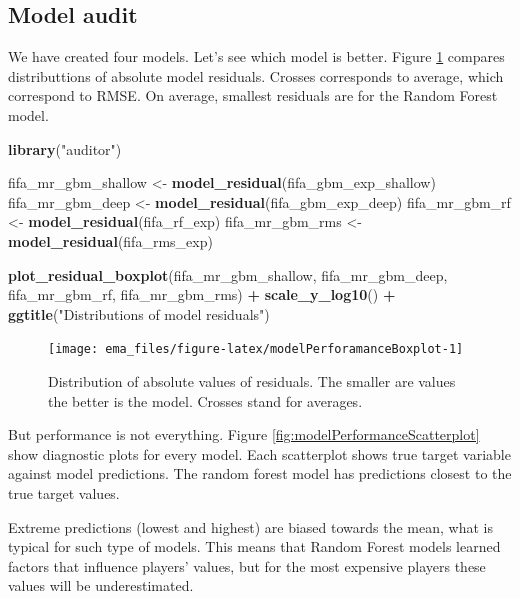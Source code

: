 \documentclass[12pt,]{krantz}
\newenvironment{Shaded}{\begin{snugshade}}{\end{snugshade}}
\newcommand{\KeywordTok}[1]{\textcolor[rgb]{0.13,0.29,0.53}{\textbf{#1}}}
\newcommand{\NormalTok}[1]{#1}
\newcommand{\OperatorTok}[1]{\textcolor[rgb]{0.81,0.36,0.00}{\textbf{#1}}}
\newcommand{\StringTok}[1]{\textcolor[rgb]{0.31,0.60,0.02}{#1}}
\begin{document}
\hypertarget{model-audit}{%
\subsection{Model audit}\label{model-audit}}

We have created four models. Let's see which model is better. Figure \ref{fig:modelPerforamanceBoxplot} compares distributtions of absolute model residuals. Crosses corresponds to average, which correspond to RMSE. On average, smallest residuals are for the Random Forest model.

\begin{Shaded}
\begin{Highlighting}[]
\KeywordTok{library}\NormalTok{(}\StringTok{"auditor"}\NormalTok{)}

\NormalTok{fifa_mr_gbm_shallow <-}\StringTok{ }\KeywordTok{model_residual}\NormalTok{(fifa_gbm_exp_shallow)}
\NormalTok{fifa_mr_gbm_deep <-}\StringTok{ }\KeywordTok{model_residual}\NormalTok{(fifa_gbm_exp_deep)}
\NormalTok{fifa_mr_gbm_rf <-}\StringTok{ }\KeywordTok{model_residual}\NormalTok{(fifa_rf_exp)}
\NormalTok{fifa_mr_gbm_rms <-}\StringTok{ }\KeywordTok{model_residual}\NormalTok{(fifa_rms_exp)}

\KeywordTok{plot_residual_boxplot}\NormalTok{(fifa_mr_gbm_shallow, fifa_mr_gbm_deep, fifa_mr_gbm_rf, fifa_mr_gbm_rms) }\OperatorTok{+}
\StringTok{  }\KeywordTok{scale_y_log10}\NormalTok{() }\OperatorTok{+}
\StringTok{  }\KeywordTok{ggtitle}\NormalTok{(}\StringTok{"Distributions of model residuals"}\NormalTok{)}
\end{Highlighting}
\end{Shaded}

\begin{figure}

{\centering \texttt{[image: ema\_files/figure-latex/modelPerforamanceBoxplot-1]} 

}

\caption{Distribution of absolute values of residuals. The smaller are values the better is the model. Crosses stand for averages.}\label{fig:modelPerforamanceBoxplot}
\end{figure}

But performance is not everything. Figure \ref{fig:modelPerformanceScatterplot} show diagnostic plots for every model. Each scatterplot shows true target variable against model predictions. The random forest model has predictions closest to the true target values.

Extreme predictions (lowest and highest) are biased towards the mean, what is typical for such type of models. This means that Random Forest models learned factors that influence players' values, but for the most expensive players these values will be underestimated.
\end{document}
